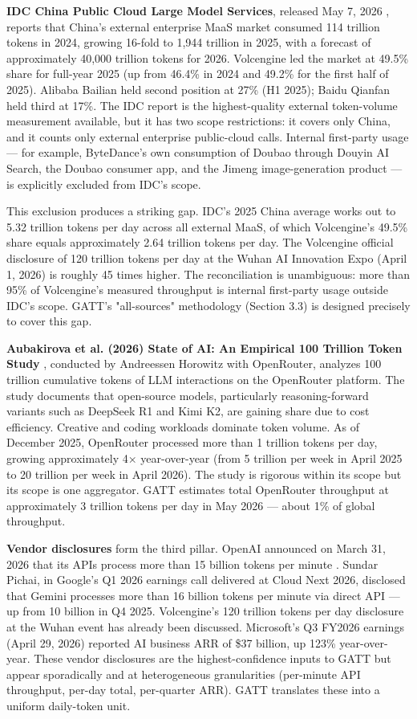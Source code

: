 \documentclass[11pt,a4paper]{article}
\begin{document}
\textbf{IDC China Public Cloud Large Model Services}, released May 7, 2026 \cite{idc2026china}, reports that China's external enterprise MaaS market consumed 114 trillion tokens in 2024, growing 16-fold to 1,944 trillion in 2025, with a forecast of approximately 40,000 trillion tokens for 2026. Volcengine led the market at 49.5\% share for full-year 2025 (up from 46.4\% in 2024 and 49.2\% for the first half of 2025). Alibaba Bailian held second position at 27\% (H1 2025); Baidu Qianfan held third at 17\%. The IDC report is the highest-quality external token-volume measurement available, but it has two scope restrictions: it covers only China, and it counts only external enterprise public-cloud calls. Internal first-party usage --- for example, ByteDance's own consumption of Doubao through Douyin AI Search, the Doubao consumer app, and the Jimeng image-generation product --- is explicitly excluded from IDC's scope.

This exclusion produces a striking gap. IDC's 2025 China average works out to 5.32 trillion tokens per day across all external MaaS, of which Volcengine's 49.5\% share equals approximately 2.64 trillion tokens per day. The Volcengine official disclosure of 120 trillion tokens per day at the Wuhan AI Innovation Expo (April 1, 2026) is roughly 45 times higher. The reconciliation is unambiguous: more than 95\% of Volcengine's measured throughput is internal first-party usage outside IDC's scope. GATT's "all-sources" methodology (Section 3.3) is designed precisely to cover this gap.

\textbf{Aubakirova et al. (2026) State of AI: An Empirical 100 Trillion Token Study} \cite{aubakirova2026state}, conducted by Andreessen Horowitz with OpenRouter, analyzes 100 trillion cumulative tokens of LLM interactions on the OpenRouter platform. The study documents that open-source models, particularly reasoning-forward variants such as DeepSeek R1 and Kimi K2, are gaining share due to cost efficiency. Creative and coding workloads dominate token volume. As of December 2025, OpenRouter processed more than 1 trillion tokens per day, growing approximately 4× year-over-year (from 5 trillion per week in April 2025 to 20 trillion per week in April 2026). The study is rigorous within its scope but its scope is one aggregator. GATT estimates total OpenRouter throughput at approximately 3 trillion tokens per day in May 2026 --- about 1\% of global throughput.

\textbf{Vendor disclosures} form the third pillar. OpenAI announced on March 31, 2026 that its APIs process more than 15 billion tokens per minute \cite{openai2026next}. Sundar Pichai, in Google's Q1 2026 earnings call delivered at Cloud Next 2026, disclosed that Gemini processes more than 16 billion tokens per minute via direct API \cite{pichai2026cloudnext} --- up from 10 billion in Q4 2025. Volcengine's 120 trillion tokens per day disclosure at the Wuhan event has already been discussed. Microsoft's Q3 FY2026 earnings (April 29, 2026) reported AI business ARR of \$37 billion, up 123\% year-over-year. These vendor disclosures are the highest-confidence inputs to GATT but appear sporadically and at heterogeneous granularities (per-minute API throughput, per-day total, per-quarter ARR). GATT translates these into a uniform daily-token unit.
\end{document}
